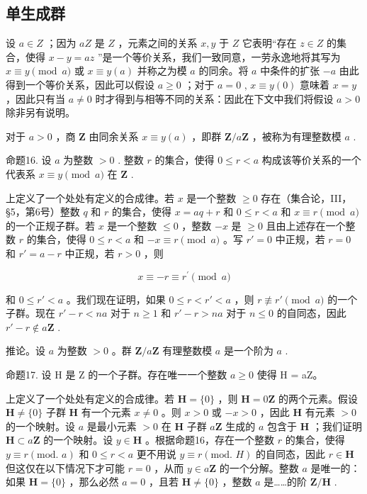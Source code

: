 \subsection{单生成群}

设 \(a \in Z\) ；因为 \(aZ\) 是 \(Z\) ，元素之间的关系 \(x, y\) 于 \(Z\) 它表明“存在 \(z \in Z\) 的集合，使得 \(x - y = az\) ”是一个等价关系，我们一致同意，一劳永逸地将其写为 \(x \equiv y \pmod{a}\) 或 \(x \equiv y(a)\) 并称之为模 \(a\) 的同余。将 \(a\) 中条件的扩张 \(-a\) 由此得到一个等价关系，因此可以假设 \(a \geqslant 0\) ；对于 \(a = 0\) , \(x \equiv y(0)\) 意味着 \(x = y\) ，因此只有当 \(a \neq 0\) 时才得到与相等不同的关系：因此在下文中我们将假设 \(a > 0\) 除非另有说明。

对于 \(a > 0\) ，商 \(\mathbf{Z}\) 由同余关系 \(x \equiv y(a)\) ，即群 \(\mathbf{Z}/a\mathbf{Z}\) ，被称为有理整数模 \(a\) .

命题16. 设 \(a\) 为整数 \(>0\) . 整数 \(r\) 的集合，使得 \(0 \leqslant r < a\) 构成该等价关系的一个代表系 \(x \equiv y \pmod{a}\) 在 \(\mathbf{Z}\) .

上定义了一个处处有定义的合成律。若 \(x\) 是一个整数 \(\geqslant 0\) 存在（集合论，III，§5，第6号）整数 \(q\) 和 \(r\) 的集合，使得 \(x = aq + r\) 和 \(0 \leqslant r < a\) 和 \(x \equiv r \pmod{a}\) 的一个正规子群。若 \(x\) 是一个整数 \(\leqslant 0\) ，整数 \(-x\) 是 \(\geqslant 0\) 且由上述存在一个整数 \(r\) 的集合，使得 \(0 \leqslant r < a\) 和 \(-x \equiv r \pmod{a}\) 。写 \(r' = 0\) 中正规，若 \(r = 0\) 和 \(r' = a - r\) 中正规，若 \(r > 0\) ，则

\[
x \equiv - r \equiv r ^ {\prime} \pmod {a}
\]

和 \(0 \leqslant r' < a\) 。我们现在证明，如果 \(0 \leqslant r < r' < a\) ，则 \(r \not\equiv r' \pmod{a}\) 的一个子群。现在 \(r' - r < na\) 对于 \(n \geqslant 1\) 和 \(r' - r > na\) 对于 \(n \leqslant 0\) 的自同态，因此 \(r' - r \notin a\mathbf{Z}\) .

推论。设 \(a\) 为整数 \(> 0\) 。群 \(\mathbf{Z} / a\mathbf{Z}\) 有理整数模 \(a\) 是一个阶为 \(a\) .

命题17. 设 H 是 Z 的一个子群。存在唯一一个整数 \(a \geqslant 0\) 使得 H = aZ。

上定义了一个处处有定义的合成律。若 \(\mathbf{H} = \{0\}\) ，则 \(\mathbf{H} = 0\mathbf{Z}\) 的两个元素。假设 \(\mathbf{H} \neq \{0\}\) 子群 \(\mathbf{H}\) 有一个元素 \(x \neq 0\) 。则 \(x > 0\) 或 \(-x > 0\) ，因此 \(\mathbf{H}\) 有元素 \(>0\) 的一个映射。设 \(a\) 是最小元素 \(>0\) 在 \(\mathbf{H}\) 子群 \(a\mathbf{Z}\) 生成的 \(a\) 包含于 \(\mathbf{H}\) ；我们证明 \(\mathbf{H} \subset a\mathbf{Z}\) 的一个映射。设 \(y \in \mathbf{H}\) 。根据命题16，存在一个整数 \(r\) 的集合，使得 \(y \equiv r (\text{mod. } a)\) 和 \(0 \leqslant r < a\) 更不用说 \(y \equiv r (\text{mod. } H)\) 的自同态，因此 \(r \in \mathbf{H}\) 但这仅在以下情况下才可能 \(r = 0\) ，从而 \(y \in a\mathbf{Z}\) 的一个分解。整数 \(a\) 是唯一的：如果 \(\mathbf{H} = \{0\}\) ，那么必然 \(a = 0\) ，且若 \(\mathbf{H} \neq \{0\}\) ，整数 \(a\) 是……的阶 \(\mathbf{Z}/\mathbf{H}\) .

